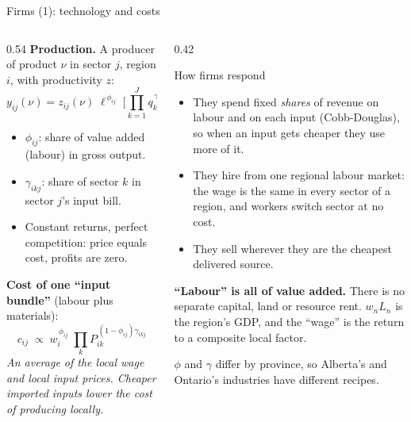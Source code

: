 \documentclass[aspectratio=169,9pt,t]{beamer}
\newcommand{\plain}[1]{{\color{ipgrey}\small\itshape #1}}
\begin{document}
\begin{frame}{Firms (1): technology and costs}
  \begin{columns}[T]
    \begin{column}{0.54\textwidth}
      \textbf{Production.} A producer of product $\nu$ in sector $j$,
      region $i$, with productivity $z$:
      \[ y_{ij}(\nu)=z_{ij}(\nu)\;\ell^{\,\phi_{ij}}\;\Big[\prod_{k=1}^{J} q_k^{\,\gamma_{ikj}}\Big]^{1-\phi_{ij}} \]
      \begin{itemize}
        \item $\phi_{ij}$: share of value added (labour) in gross output.
        \item $\gamma_{ikj}$: share of sector $k$ in sector $j$'s input bill.
        \item Constant returns, perfect competition: price equals cost,
              profits are zero.
      \end{itemize}
      \textbf{Cost of one ``input bundle''} (labour plus materials):
      \[ c_{ij}\;\propto\; w_i^{\,\phi_{ij}}\;\prod_k P_{ik}^{\,(1-\phi_{ij})\gamma_{ikj}} \]
      \plain{An average of the local wage and local input prices. Cheaper
      imported inputs lower the cost of producing locally.}
    \end{column}
    \begin{column}{0.42\textwidth}
      \begin{block}{How firms respond}
        \small
        \begin{itemize}
          \item They spend fixed \emph{shares} of revenue on labour and on
                each input (Cobb-Douglas), so when an input gets cheaper
                they use more of it.
          \item They hire from one regional labour market: the wage is
                the same in every sector of a region, and workers switch
                sector at no cost.
          \item They sell wherever they are the cheapest delivered source.
        \end{itemize}
      \end{block}
      \small
      \textbf{``Labour'' is all of value added.} There is no separate
      capital, land or resource rent. $w_nL_n$ is the region's GDP, and
      the ``wage'' is the return to a composite local factor.

      \smallskip
      $\phi$ and $\gamma$ differ by province, so Alberta's and Ontario's
      industries have different recipes.
    \end{column}
  \end{columns}
\end{frame}
\end{document}

